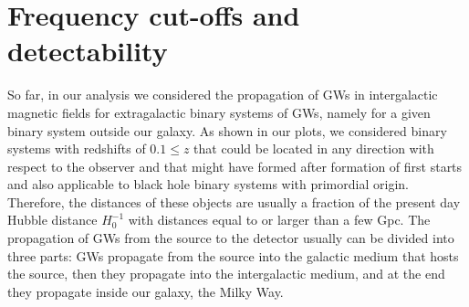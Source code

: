 \documentclass[a4paper,11pt]{article}
\begin{document}



\section{Frequency cut-offs and detectability}
\label{sec:8}

So far, in our analysis we considered the propagation of GWs in intergalactic magnetic fields for extragalactic binary systems of GWs, namely for a given binary system outside our galaxy. As shown in our plots, we considered binary systems with redshifts of $0.1 \leq z$ that could be located in any direction with respect to the observer and that might have formed after formation of first starts and also applicable to black hole binary systems with primordial origin. Therefore, the distances of these objects are usually a fraction of the present day Hubble distance $H_0^{-1}$ with distances equal to or larger than a few Gpc. The propagation of GWs from the source to the detector usually can be divided into three parts: GWs propagate from the source into the galactic medium that hosts the source, then they propagate into the intergalactic medium, and at the end they propagate inside our galaxy, the Milky Way.
\end{document}
